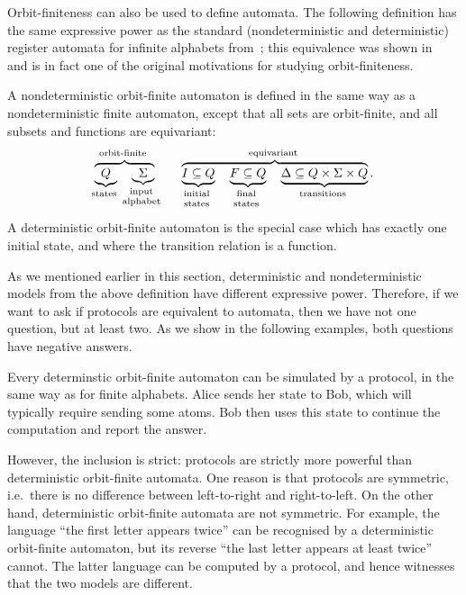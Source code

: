 Orbit-finiteness can also be used to define automata. The following definition has the same expressive power as the standard (nondeterministic and deterministic) register automata for infinite alphabets from~\cite{kaminskiFiniteMemoryAutomata1994}; this equivalence was shown in~\cite[Lemma 6.3]{bojanczykAutomataTheoryNominal2014} and is in fact one of the original motivations for studying orbit-finiteness.

\begin{definition}
    \label{def:orbit-finite-automata}
    A nondeterministic orbit-finite automaton is defined in the same way as a nondeterministic finite automaton, except that all sets are orbit-finite, and all subsets and functions are equivariant: 
\begin{align*}
    \myoverbrace{
        \myunderbrace{Q}{states} \quad 
        \myunderbrace{\Sigma}{input \\ alphabet}
    }
    {orbit-finite}
    \qquad
    \myoverbrace{
        \myunderbrace{I \subseteq Q}{initial \\ states} \quad 
        \myunderbrace{F \subseteq Q}{final \\ states} \quad 
        \myunderbrace{\Delta \subseteq Q \times \Sigma \times Q}{transitions}
    }{equivariant}.
\end{align*}
A deterministic orbit-finite automaton is the special case which has exactly one initial state, and where the transition relation is a function.
\end{definition}
 


As we mentioned earlier in this section, deterministic and nondeterministic models from the above definition have different expressive power. Therefore, if we want to ask if protocols are equivalent to automata, then we have not one question, but at least two. As we show in the following examples, both questions have negative answers.



\begin{myexample}
    \label{ex:protocol-not-dofa}
     Every determinstic orbit-finite automaton can be simulated by a protocol, in the same way as for finite alphabets. Alice sends her state to Bob, which will typically require sending some atoms. Bob then uses this state to continue the computation and report the answer. 
    
    However, the inclusion is strict: protocols are strictly more powerful than deterministic orbit-finite automata. One reason is that protocols are symmetric, i.e.~there is no difference between left-to-right and right-to-left. On the other hand, deterministic orbit-finite automata are not symmetric. For example, the language ``the first letter appears twice'' can be recognised by a deterministic orbit-finite automaton, but its reverse ``the last letter appears at least twice'' cannot. The latter language can be computed by a protocol, and hence witnesses that the two models are different. 
\end{myexample}


